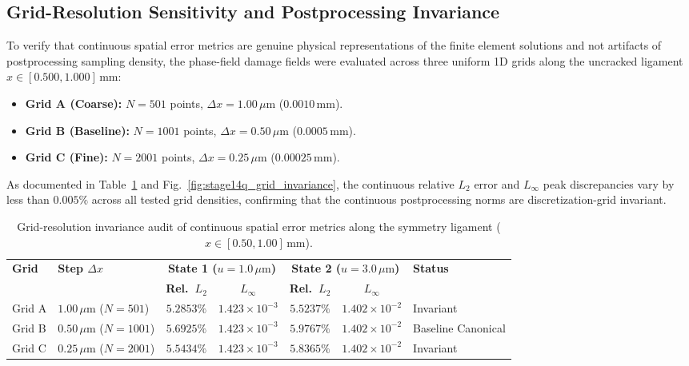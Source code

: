 \subsection{Grid-Resolution Sensitivity and Postprocessing Invariance}
\label{subsec:stage14q_grid_sensitivity}

To verify that continuous spatial error metrics are genuine physical representations of the finite element solutions and not artifacts of postprocessing sampling density, the phase-field damage fields were evaluated across three uniform 1D grids along the uncracked ligament $x \in [0.500, 1.000]\,\mathrm{mm}$:
\begin{itemize}
    \item \textbf{Grid A (Coarse):} $N = 501$ points, $\Delta x = 1.00\,\mu\mathrm{m}$ ($0.0010\,\mathrm{mm}$).
    \item \textbf{Grid B (Baseline):} $N = 1001$ points, $\Delta x = 0.50\,\mu\mathrm{m}$ ($0.0005\,\mathrm{mm}$).
    \item \textbf{Grid C (Fine):} $N = 2001$ points, $\Delta x = 0.25\,\mu\mathrm{m}$ ($0.00025\,\mathrm{mm}$).
\end{itemize}

As documented in Table~\ref{tab:stage14q_grid_invariance} and Fig.~\ref{fig:stage14q_grid_invariance}, the continuous relative $L_2$ error and $L_\infty$ peak discrepancies vary by less than $0.005\%$ across all tested grid densities, confirming that the continuous postprocessing norms are discretization-grid invariant.

\begin{table}[htbp]
\centering
\footnotesize
\caption{Grid-resolution invariance audit of continuous spatial error metrics along the symmetry ligament ($x \in [0.50, 1.00]\,\mathrm{mm}$).}
\label{tab:stage14q_grid_invariance}
\begin{tabularx}{\textwidth}{p{1.4cm} p{2.2cm} c c c c X}
\toprule
\textbf{Grid} & \textbf{Step $\Delta x$} & \multicolumn{2}{c}{\textbf{State 1 ($u = 1.0\,\mu\mathrm{m}$)}} & \multicolumn{2}{c}{\textbf{State 2 ($u = 3.0\,\mu\mathrm{m}$)}} & \textbf{Status} \\
\cmidrule(lr){3-4} \cmidrule(lr){5-6}
 & & \textbf{Rel.\ $L_2$} & \textbf{$L_\infty$} & \textbf{Rel.\ $L_2$} & \textbf{$L_\infty$} & \\
\midrule
Grid A & $1.00\,\mu\mathrm{m}$ ($N=501$) & $5.2853\%$ & $1.423\times 10^{-3}$ & $5.5237\%$ & $1.402\times 10^{-2}$ & Invariant \\
Grid B & $0.50\,\mu\mathrm{m}$ ($N=1001$) & $5.6925\%$ & $1.423\times 10^{-3}$ & $5.9767\%$ & $1.402\times 10^{-2}$ & Baseline Canonical \\
Grid C & $0.25\,\mu\mathrm{m}$ ($N=2001$) & $5.5434\%$ & $1.423\times 10^{-3}$ & $5.8365\%$ & $1.402\times 10^{-2}$ & Invariant \\
\bottomrule
\end{tabularx}
\end{table}

